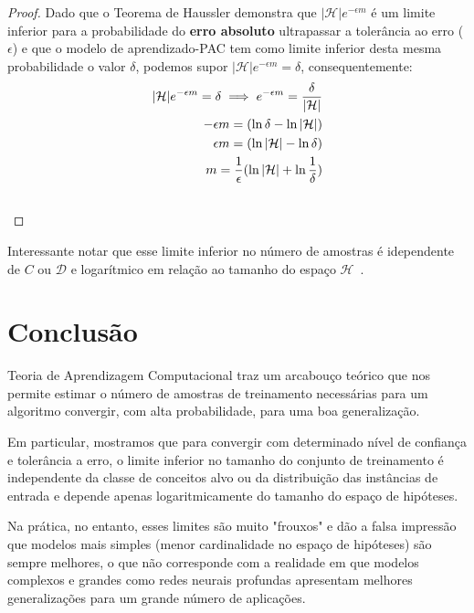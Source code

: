 \documentclass[
10pt, %
a4paper, %
onecolumn, %
]{article}
\begin{document}
\bigskip

\noindent{}

\begin{proof}  Dado que o  Teorema de Haussler demonstra que $|\mathcal{H}|e^{-\epsilon m}$ é um limite inferior para a probabilidade do \textbf{erro absoluto} ultrapassar a tolerância ao erro ($\epsilon$) e que o modelo de aprendizado-PAC tem como limite inferior desta mesma probabilidade o valor $\delta$, podemos supor $|\mathcal{H}|e^{-\epsilon m}=\delta$, consequentemente:
\begin{align}
    |\mathcal{H}|e^{-\epsilon m}=\delta \implies e^{-\epsilon m} = \frac{\delta}{|\mathcal{H}|} \\
    - \epsilon m = (\ln{\delta} - \ln{|\mathcal{H}|})  \\
    \epsilon m = (\ln{|\mathcal{H}|} - \ln{\delta}) \\
    m = \frac{1}{\epsilon}(\ln{|\mathcal{H}|} + \ln{\frac{1}{\delta}}) \\
    \qedhere
\end{align}
\end{proof}


Interessante notar que esse limite inferior no número de amostras é idependente de $C$ ou $\mathcal{D}$ e logarítmico em relação ao tamanho do espaço $\mathcal{H}$~\cite{Haussler1988}.

\section{Conclusão}

Teoria de Aprendizagem Computacional traz um arcabouço teórico que nos permite estimar o número de amostras de treinamento necessárias para um algoritmo convergir, com alta probabilidade, para uma boa generalização. 

Em particular, mostramos que para convergir com determinado nível de confiança e tolerância a erro, o limite inferior no tamanho do conjunto de treinamento é independente da classe de conceitos alvo ou da distribuição das instâncias de entrada e depende apenas logaritmicamente do tamanho do espaço de hipóteses. 

Na prática, no entanto, esses limites são muito "frouxos"\cite{MitchelPAC} e dão a falsa impressão que modelos mais simples (menor cardinalidade no espaço de hipóteses) são sempre melhores, o que não corresponde com a realidade em que modelos complexos e grandes como redes neurais profundas apresentam melhores generalizações para um grande número de aplicações.
\end{document}
